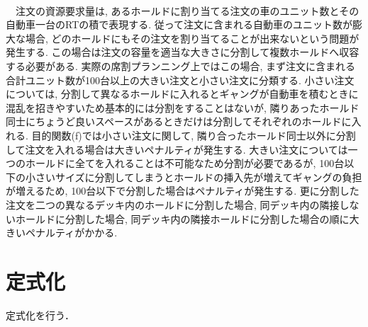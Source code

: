  \\
　注文の資源要求量は, あるホールドに割り当てる注文の車のユニット数とその自動車一台のRTの積で表現する. 従って注文に含まれる自動車のユニット数が膨大な場合, どのホールドにもその注文を割り当てることが出来ないという問題が発生する. この場合は注文の容量を適当な大きさに分割して複数ホールドへ収容する必要がある. 実際の席割プランニング上ではこの場合, まず注文に含まれる合計ユニット数が100台以上の大きい注文と小さい注文に分類する. 小さい注文については, 分割して異なるホールドに入れるとギャングが自動車を積むときに混乱を招きやすいため基本的には分割をすることはないが, 隣りあったホールド同士にちょうど良いスペースがあるときだけは分割してそれぞれのホールドに入れる. 目的関数(f)では小さい注文に関して, 隣り合ったホールド同士以外に分割して注文を入れる場合は大きいペナルティが発生する. 大きい注文については一つのホールドに全てを入れることは不可能なため分割が必要であるが,  100台以下の小さいサイズに分割してしまうとホールドの挿入先が増えてギャングの負担が増えるため, 100台以下で分割した場合はペナルティが発生する. 更に分割した注文を二つの異なるデッキ内のホールドに分割した場合, 同デッキ内の隣接しないホールドに分割した場合, 同デッキ内の隣接ホールドに分割した場合の順に大きいペナルティがかかる. \\

\section{定式化}
定式化を行う．

